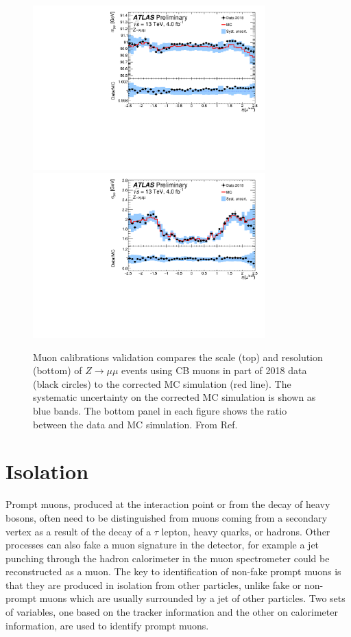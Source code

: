 \begin{figure}[h!]
  \centering
  \includegraphics[width=0.8\textwidth]{figures/muons/scale} \
  \includegraphics[width=0.8\textwidth]{figures/muons/reso}
  \caption[Muon calibration validation.]{Muon calibrations
  validation compares the scale (top) and resolution (bottom)
  of $Z\rightarrow\mu\mu$ events using CB muons in part of
  2018 data (black circles) to the corrected MC simulation
  (red line). The systematic uncertainty on the corrected MC
  simulation is shown as blue bands. The bottom panel in each
  figure shows the ratio between the data and MC simulation.
  From Ref. \cite{Barone:2320120}}
  \label{fig:muon:calibration}
\end{figure}

\section{Isolation}

Prompt muons, produced at the interaction point or from the decay of heavy
bosons, often need to be distinguished from muons coming from a secondary
vertex as a result of the decay of a $\tau$ lepton, heavy quarks, or
hadrons. Other processes can also fake a muon signature in the detector,
for example a jet punching through the hadron calorimeter in the muon
spectrometer could be reconstructed as a muon. The key to identification
of non-fake prompt muons is that they are produced in isolation from
other particles, unlike fake or non-prompt muons which are usually
surrounded by a jet of other particles. Two sets of variables, one based
on the tracker information and the other on calorimeter information, are
used to identify prompt muons.

